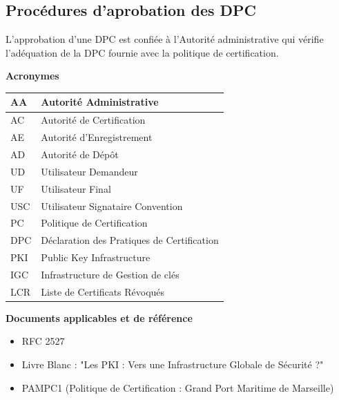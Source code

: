 \documentclass[a4paper,11pt,french]{article}
\begin{document}
\subsection{Procédures d'aprobation des DPC}
L’approbation d’une DPC est confiée à l’Autorité administrative qui vérifie l’adéquation de la DPC fournie avec la politique de certification.

\newpage
\textbf {Acronymes}


\begin{tabular}{|l|p{10cm}|}
\hline
AA  & Autorité Administrative
\\
\hline
AC & Autorité de Certification
\\
\hline
AE  & Autorité d'Enregistrement 
\\
\hline
AD  & Autorité de Dépôt
\\
\hline
UD  & Utilisateur Demandeur 
\\
\hline
UF & Utilisateur Final
\\
\hline
USC &  Utilisateur Signataire Convention
\\
\hline
PC & Politique de Certification
\\
\hline
DPC & Déclaration des Pratiques de Certification
\\
\hline
PKI & Public Key Infrastructure
\\
\hline
IGC & Infrastructure de Gestion de clés
\\
\hline
LCR & Liste de Certificats Révoqués
\\
\hline

\end{tabular}

\newpage
\textbf {Documents applicables et de référence}
\begin{itemize}
\item RFC 2527
\item Livre Blanc : "Les PKI : Vers une Infrastructure
Globale de Sécurité ?"
\item PAMPC1 (Politique de Certification : Grand Port Maritime de Marseille)
\end{itemize}
\end{document}
